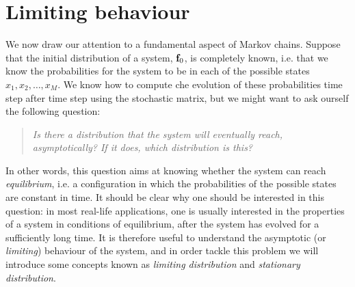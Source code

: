 \section{Limiting behaviour}
We now draw our attention to a fundamental aspect of Markov chains. Suppose that the initial distribution of a system, $\mathbf{f}_0$, is completely known, i.e. that we know the probabilities for the system to be in each of the possible states $x_1, x_2, \dots, x_M$. We know how to compute che evolution of these probabilities time step after time step using the stochastic matrix, but we might want to ask ourself the following question:
\begin{quote}
    \emph{Is there a distribution that the system will eventually reach, asymptotically? If it does, which distribution is this?}
\end{quote}
In other words, this question aims at knowing whether the system can reach \emph{equilibrium}, i.e. a configuration in which the probabilities of the possible states are constant in time.
It should be clear why one should be interested in this question: in most real-life applications, one is usually interested in the properties of a system in conditions of equilibrium, after the system has evolved for a sufficiently long time. It is therefore useful to understand the asymptotic (or \emph{limiting}) behaviour of the system, and in order tackle this problem we will introduce some concepts known as \emph{limiting distribution} and \emph{stationary distribution}.

